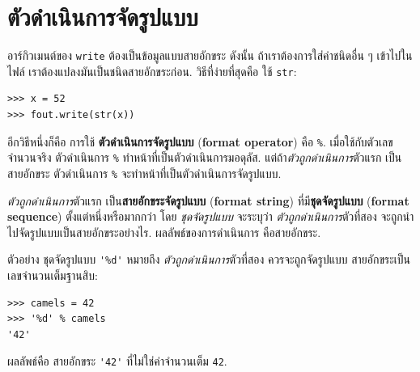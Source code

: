 \section{ตัวดำเนินการจัดรูปแบบ}
\label{file Format operator}



อาร์กิวเมนต์ของ \texttt{write} ต้องเป็นข้อมูลแบบสายอักขระ
ดังนั้น ถ้าเราต้องการใส่ค่าชนิดอื่น ๆ เข้าไปในไฟล์
เราต้องแปลงมันเป็นชนิดสายอักขระก่อน.
วิธีที่ง่ายที่สุดคือ ใช้ \texttt{str}:

\begin{verbatim}
>>> x = 52
>>> fout.write(str(x))
\end{verbatim}
%
%
อีกวิธีหนึ่งก็คือ การใช้ \textbf{ตัวดำเนินการจัดรูปแบบ} (\textbf{format operator})
คือ \texttt{\%}.
เมื่อใช้กับตัวเลขจำนวนจริง ตัวดำเนินการ \texttt{\%} ทำหน้าที่เป็นตัวดำเนินการมอดุลัส.
แต่ถ้า\textit{ตัวถูกดำเนินการ}ตัวแรก เป็นสายอักขระ
ตัวดำเนินการ \texttt{\%} จะทำหน้าที่เป็นตัวดำเนินการจัดรูปแบบ.


\textit{ตัวถูกดำเนินการ}ตัวแรก เป็น\textbf{สายอักขระจัดรูปแบบ} (\textbf{format string}) ที่มี\textbf{ชุดจัดรูปแบบ} (\textbf{format sequence}) ตั้งแต่หนึ่งหรือมากกว่า
โดย \textit{ชุดจัดรูปแบบ} จะระบุว่า \textit{ตัวถูกดำเนินการ}ตัวที่สอง จะถูกนำไปจัดรูปแบบเป็นสายอักขระอย่างไร.
ผลลัพธ์ของการดำเนินการ คือสายอักขระ.


ตัวอย่าง ชุดจัดรูปแบบ \verb|'%d'|
หมายถึง
\textit{ตัวถูกดำเนินการ}ตัวที่สอง ควรจะถูกจัดรูปแบบ 
สายอักขระเป็นเลขจำนวนเต็มฐานสิบ:

\begin{verbatim}
>>> camels = 42
>>> '%d' % camels
'42'
\end{verbatim}
%
%
ผลลัพธ์คือ สายอักขระ \verb|'42'| ที่ไม่ใช่ค่าจำนวนเต็ม \texttt{42}.

